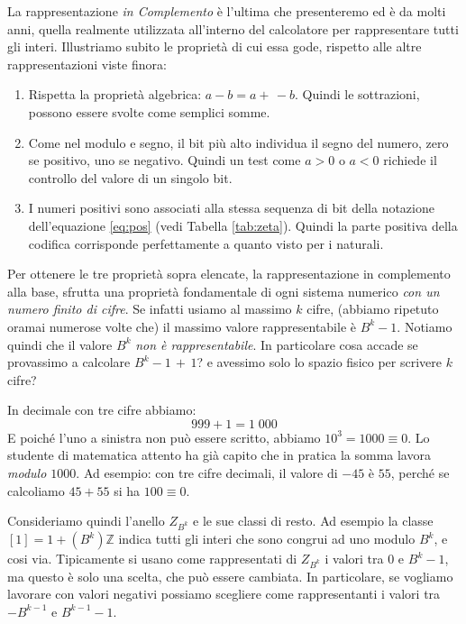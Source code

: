 La rappresentazione \emph{in Complemento} è l'ultima che presenteremo ed è da molti anni, quella realmente utilizzata all'interno del calcolatore per
rappresentare tutti gli interi. Illustriamo subito le proprietà
di cui essa gode, rispetto alle altre rappresentazioni viste finora:
\begin{enumerate}
	\item Rispetta la proprietà algebrica:  $a - b = a +\, -b$. Quindi le sottrazioni, possono essere svolte come semplici somme.
	\item Come nel modulo e segno, il bit più alto individua il segno del numero, zero se positivo, uno se negativo. Quindi un test come $a > 0$ o $a < 0$
	richiede il controllo del valore di un singolo bit.
	\item I numeri positivi sono associati alla stessa sequenza di bit della notazione dell'equazione \eqref{eq:pos} (vedi Tabella \ref{tab:zeta}). Quindi la parte positiva della
	codifica corrisponde perfettamente a quanto visto per i naturali.
\end{enumerate}

Per ottenere le tre proprietà sopra elencate, la
rappresentazione in complemento alla base, sfrutta una proprietà fondamentale
di ogni sistema numerico \emph{con un numero finito di cifre}. Se infatti usiamo al massimo $k$ cifre, (abbiamo ripetuto oramai numerose volte che) il massimo valore rappresentabile è $B^k-1$. Notiamo quindi che il valore
$B^k$ \emph{non è rappresentabile}. In particolare cosa accade se provassimo a calcolare $B^k-1\,+\,1$? e avessimo solo lo spazio fisico per scrivere $k$ cifre?

\begin{ex} In decimale con tre cifre abbiamo:
	\[ \boxed{9}\boxed{9}\boxed{9} + 1 = 1\;\boxed{0}\boxed{0}\boxed{0} \]
E poiché l'uno a sinistra non può essere scritto, abbiamo $10^3 = 1000 \equiv 0$. Lo studente di matematica attento ha già capito che in pratica la somma lavora \emph{modulo $1000$}. Ad esempio: con tre cifre decimali, il valore di $-45$ è $55$, perché se calcoliamo $45 + 55$ si ha $100 \equiv 0$.
\end{ex}

Consideriamo quindi l'anello $Z_{B^k}$ e le sue classi di resto. Ad esempio la
classe $[1] = 1 + (B^k)\mathbb{Z}$ indica tutti gli interi che sono congrui ad
uno modulo $B^k$, e cosi via. Tipicamente si usano come rappresentati di
$Z_{B^k}$ i valori tra $0$ e $B^k-1$, ma questo è solo una scelta, che può
essere cambiata. In particolare, se vogliamo lavorare con valori negativi
possiamo scegliere come rappresentanti i valori tra $-B^{k-1}$ e $B^{k-1}-1$.

